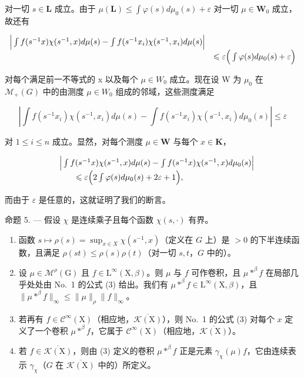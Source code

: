 对一切 \(s \in \mathbf{L}\) 成立。由于 \(\mu(\mathbf{L}) \leqslant \int \varphi(s) d\mu_0(s) + \varepsilon\) 对一切 \(\mu \in \mathbf{W}_0\) 成立，故还有

\[
\begin{array}{r l} \Big | \int f (s ^ {- 1} x) \chi (s ^ {- 1}, x) d \mu (s) - \int f (s ^ {- 1} x _ {i}) \chi (s ^ {- 1}, x _ {i}) d \mu (s) \Big | & \\ & \leqslant \varepsilon \Big (\int \varphi (s) d \mu_ {0} (s) + \varepsilon \Big) \end{array}
\]

对每个满足前一不等式的 x 以及每个 \(\mu \in W_{0}\) 成立。现在设 W 为 \(\mu_{0}\) 在 \(\mathcal{M}_{+}(G)\) 中的由测度 \(\mu \in W_{0}\) 组成的邻域，这些测度满足

\[
\left| \int f (s ^ {- 1} x _ {i}) \chi (s ^ {- 1}, x _ {i}) d \mu (s) - \int f (s ^ {- 1} x _ {i}) \chi (s ^ {- 1}, x _ {i}) d \mu_ {0} (s) \right| \leqslant \varepsilon
\]

对 \(1 \leqslant i \leqslant n\) 成立。显然，对每个测度 \(\mu \in \mathbf{W}\) 与每个 \(x \in \mathbf{K}\)，

\[
\begin{array}{r l} & {\Big | \int f (s ^ {- 1} x) \chi (s ^ {- 1}, x) d \mu (s) - \int f (s ^ {- 1} x) \chi (s ^ {- 1}, x) d \mu_ {0} (s) \Big |} \\ & {\qquad \leqslant \varepsilon \Big (2 \int \varphi (s) d \mu_ {0} (s) + 2 \varepsilon + 1 \Big),} \end{array}
\]

而由于 \(\varepsilon\) 是任意的，这就证明了我们的断言。

命题 5. --- 假设 \(\chi\) 是连续乘子且每个函数 \(\chi(s,\cdot)\) 有界。

\begin{enumerate}
\def\labelenumi{(\roman{enumi})}
\item
  函数 \(s \mapsto \rho(s) = \sup_{x \in X} \chi(s^{-1}, x)\)（定义在 \(G\) 上）是 \(> 0\) 的下半连续函数，且满足 \(\rho(st) \leqslant \rho(s)\rho(t)\)（对一切 \(s, t\)，\(G\) 中的）。
\item
  设 \(\mu \in \mathcal{M}^{\rho}(\mathrm{G})\) 且 \(f \in \mathrm{L}^{\infty}(\mathrm{X},\beta)\)。则 \(\mu\) 与 \(f\) 可作卷积，且 \(\mu *^{\beta} f\) 在局部几乎处处由 No.~1 的公式 (3) 给出。我们有 \(\mu *^{\beta} f \in \mathrm{L}^{\infty}(\mathrm{X},\beta)\)，且 \(\| \mu *^{\beta} f \|_{\infty} \leqslant \| \mu \|_{\rho} \| f \|_{\infty}\)。
\item
  若再有 \(f \in \mathcal{C}^{\infty}(\mathrm{X})\)（相应地，\(\overline{\mathcal{K}(\mathrm{X})}\)），则 No.~1 的公式 (3) 对每个 \(x\) 定义了一个卷积 \(\mu *^{\beta}f\)，它属于 \(\mathcal{C}^{\infty}(\mathrm{X})\)（相应地，\(\overline{\mathcal{K}(\mathrm{X})}\)）。
\item
  若 \(f \in \overline{\mathcal{K}(\mathrm{X})}\)，则由 (3) 定义的卷积 \(\mu *^{\beta}f\) 正是元素 \(\gamma_{\chi}(\mu)f\)，它由连续表示 \(\gamma_{\chi}\)（\(G\) 在 \(\overline{\mathcal{K}(\mathrm{X})}\) 中的）所定义。
\end{enumerate}

